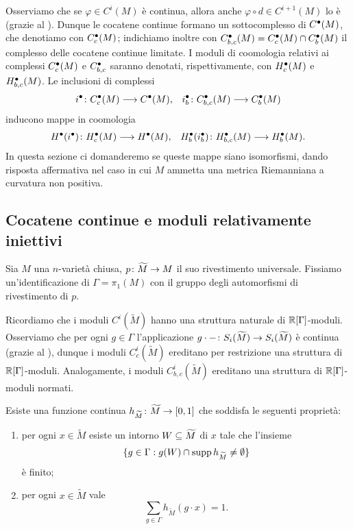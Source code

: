 Osserviamo che se $\varphi\in C^i(M)$ è continua, allora anche $\varphi\circ d\in C^{i+1}(M)$ lo è (grazie al ). Dunque le cocatene continue formano un sottocomplesso di $C^\bullet(M)$, che denotiamo con $C^\bullet_c(M)$; indichiamo inoltre con $C^\bullet_{b,c}(M)=C^\bullet_c(M)\cap C^\bullet_b(M)$ il complesso delle cocatene continue limitate. I moduli di coomologia relativi ai complessi $C^\bullet_c(M)$ e $C^\bullet_{b,c}$ saranno denotati, rispettivamente, con $H^\bullet_c(M)$ e $H^\bullet_{b,c}(M)$. Le inclusioni di complessi
\begin{align*}
\map{i^\bul}{C^\bul_c(M)}{C^\bul(M)},&&\map{i^\bul_b}{C^\bul_{b,c}(M)}{C^\bul_b(M)}
\end{align*}
inducono mappe in coomologia
\begin{align*}
\map{H^\bul(i^\bul)}{H^\bul_c(M)}{H^\bul(M)},&&\map{H^\bul_b(i^\bul_b)}{H^\bul_{b,c}(M)}{H^\bul_b(M)}.
\end{align*}
In questa sezione ci domanderemo se queste mappe siano isomorfismi, dando risposta affermativa nel caso in cui $M$ ammetta una metrica Riemanniana a curvatura non positiva.


\subsection{Cocatene continue e moduli relativamente iniettivi}

Sia $M$ una $n$-varietà chiusa, $\map{p}{\widetilde M}{M}$ il suo rivestimento universale. Fissiamo un'identificazione di $\Gamma=\pi_1(M)$ con il gruppo degli automorfismi di rivestimento di $p$.

Ricordiamo che i moduli $C^i(\widetilde M)$ hanno una struttura naturale di $\mathbb{R}[\Gamma]$-moduli. Osserviamo che per ogni $g\in\Gamma$ l'applicazione $\map{g\cdot{-}}{S_i(\widetilde M)}{S_i(\widetilde M)}$ è continua (grazie al ), dunque i moduli $C^i_c(\widetilde M)$ ereditano per restrizione una struttura di $\mathbb{R}[\Gamma]$-moduli. Analogamente, i moduli $C^i_{b,c}(\widetilde M)$ ereditano una struttura di $\mathbb{R}[\Gamma]$-moduli normati.

\begin{lemma}
Esiste una funzione continua $\map{h_{\widetilde M}}{\widetilde M}{[0,1]}$ che soddisfa le seguenti proprietà:
\begin{enumerate}
\item per ogni $x\in\widetilde M$ esiste un intorno $W\subseteq \widetilde M$ di $x$ tale che l'insieme
\[
\{g\in\Gamma:g(W)\cap \operatorname{supp} h_{\widetilde M}\neq\emptyset\}
\]
è finito;
\item per ogni $x\in\widetilde M$ vale
\[
\sum_{g\in\Gamma}h_{\widetilde M}(g\cdot x)=1.
\]
\end{enumerate}
\end{lemma}

